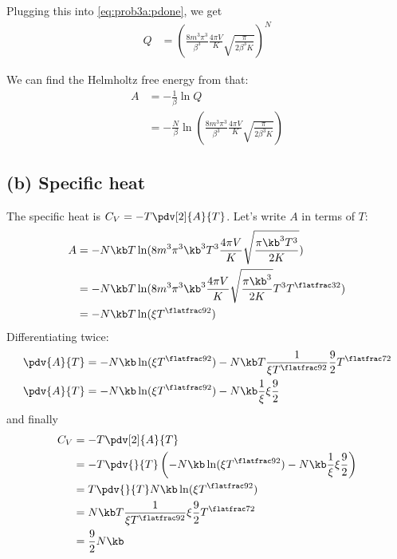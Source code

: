 \documentclass[../../PS3.tex]{subfiles}
\begin{document}
Plugging this into \eqref{eq:prob3a:pdone}, we get
\begin{align}
	Q &= \left( \frac{8 m^3 \pi^3 }{ \beta^3} \frac{4 \pi V}{K} \sqrt{\frac{\pi}{2 \beta^3 K} }\right)^N	
\end{align}

We can find the Helmholtz free energy from that:
\begin{align}
	A &= -\frac{1}{\beta} \ln{Q} \\
	&= - \frac{N}{\beta} \ln(\frac{8 m^3 \pi^3 }{ \beta^3} \frac{4 \pi V}{K} \sqrt{\frac{\pi}{2 \beta^3 K} })
\end{align}

\subsection*{(b) Specific heat}
The specific heat is $C_V = - T \pdv[2]{A}{T}$. Let's write $A$ in terms of $T$:
\begin{align}
	A &= - N \kb T \ln(8 m^3 \pi^3 \kb^3 T^3 \frac{4 \pi V}{K} \sqrt{\frac{\pi \kb^3 T^3}{2 K} }) \\
	&= - N \kb T \ln(8 m^3 \pi^3 \kb^3 \frac{4 \pi V}{K} \sqrt{\frac{\pi \kb^3}{2 K}} T^3 T^{\flatfrac32}) \\
	&= - N \kb T \ln(\xi T^{\flatfrac92})
\end{align}
Differentiating twice:
\begin{align}
	\pdv{A}{T} &= - N \kb \ln(\xi T ^{\flatfrac92}) - N \kb T \frac{1}{\xi T^{\flatfrac92}} \frac92 T^{\flatfrac72} \\ 
	\pdv{A}{T} &= - N \kb \ln(\xi T ^{\flatfrac92}) - N \kb \frac{1}{\xi} \xi \frac9	2  	
\end{align}
and finally
\begin{align}
	C_V &= - T\pdv[2]{A}{T} \\
	&= - T \pdv{}{T} \left( - N \kb \ln(\xi T ^{\flatfrac92}) - N \kb \frac{1}{\xi} \xi \frac9	2  	\right) \\
	&= T \pdv{}{T} N \kb \ln(\xi T^{\flatfrac92}) \\
	&= N \kb T \frac{1}{\xi T^{\flatfrac92}} \xi \frac92 T^{\flatfrac72} \\
	&= \frac92 N \kb
\end{align}
\end{document}
